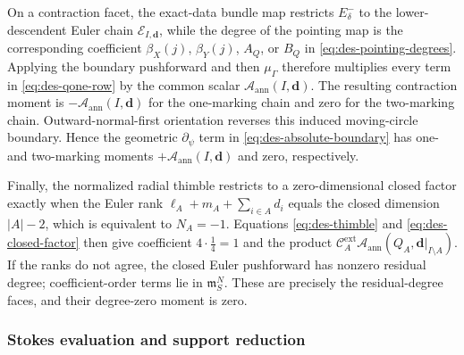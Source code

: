 On a contraction facet, the exact-data bundle map restricts $E_\delta^-$ to
the lower-descendent Euler chain $\mathcal E_{I,\mathbf d}$, while the degree
of the pointing map is the corresponding coefficient $\beta_X(j)$,
$\beta_Y(j)$, $A_Q$, or $B_Q$ in
\eqref{eq:des-pointing-degrees}.  Applying the boundary pushforward and then
$\mu_\Gamma$ therefore multiplies every term in
\eqref{eq:des-qone-row} by the common scalar
$\mathcal A_{\mathrm{ann}}(I,\mathbf d)$.  The resulting contraction moment
is $-\mathcal A_{\mathrm{ann}}(I,\mathbf d)$ for the one-marking chain and
zero for the two-marking chain.  Outward-normal-first orientation reverses
this induced moving-circle boundary.  Hence the geometric $\partial_{\psi}$ term in
\eqref{eq:des-absolute-boundary} has one- and two-marking moments
$+\mathcal A_{\mathrm{ann}}(I,\mathbf d)$ and zero, respectively.

Finally, the normalized radial thimble restricts to a zero-dimensional
closed factor exactly when the Euler rank
$\ell_A+m_A+\sum_{i\in A}d_i$ equals the closed dimension $|A|-2$,
which is equivalent to $N_A=-1$.  Equations
\eqref{eq:des-thimble} and \eqref{eq:des-closed-factor} then give coefficient
$4\cdot\frac14=1$ and the product
$\mathcal C_A^{\mathrm{ext}}\mathcal A_{\mathrm{ann}}(Q_A,
\mathbf d|_{I\setminus A})$.  If the ranks do not agree, the closed Euler
pushforward has nonzero residual degree; coefficient-order terms lie in
$\mathfrak m_S^N$.  These are precisely the residual-degree faces, and their
degree-zero moment is zero.

\subsubsection{Stokes evaluation and support reduction}

